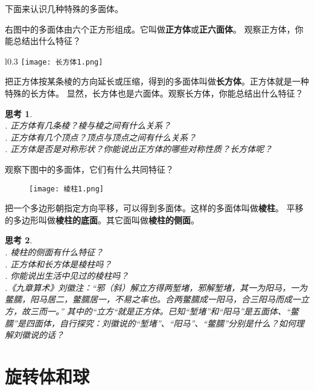 \documentclass[12pt,UTF8]{ctexbook}
\newtheorem{sk}{思考}[section]
\begin{document}
下面来认识几种特殊的多面体。

右图中的多面体由六个正方形组成。它叫做\textbf{正方体}或\textbf{正六面体}。
观察正方体，你能总结出什么特征？

\begin{wrapfigure}[4]{l}{0.3\textwidth} %
    \vspace{-20pt}
    \flushright
    \texttt{[image: 长方体1.png]}
\end{wrapfigure}

把正方体按某条棱的方向延长或压缩，得到的多面体叫做\textbf{长方体}。正方体就是一种特殊的长方体。
显然，长方体也是六面体。观察长方体，你能总结出什么特征？

\begin{sk}
    \mbox{}\\
    . 正方体有几条棱？棱与棱之间有什么关系？\\
    . 正方体有几个顶点？顶点与顶点之间有什么关系？\\
    . 正方体是否是对称形状？你能说出正方体的哪些对称性质？长方体呢？
\end{sk}

观察下图中的多面体，它们有什么共同特征？

\begin{figure}[h] %
    \vspace{4pt}
    \centering
    \texttt{[image: 棱柱1.png]}
\end{figure}

把一个多边形朝指定方向平移，可以得到多面体。这样的多面体叫做\textbf{棱柱}。
平移的多边形叫做\textbf{棱柱的底面}。其它面叫做\textbf{棱柱的侧面}。

\begin{sk}
    \mbox{}\\
    . 棱柱的侧面有什么特征？\\
    . 正方体和长方体是棱柱吗？\\
    . 你能说出生活中见过的棱柱吗？\\
    .《九章算术》刘徽注：“邪（斜）解立方得两堑堵，邪解堑堵，其一为阳马，一为鳖臑，阳马居二，鳖臑居一，不易之率也。合两鳖臑成一阳马，合三阳马而成一立方，故三而一。”
    其中的“立方“就是正方体。已知“堑堵”和“阳马”是五面体、“鳖臑”是四面体，自行探究：刘徽说的“堑堵”、“阳马”、“鳖臑”分别是什么？如何理解刘徽说的话？
\end{sk}

\section{旋转体和球}
\end{document}
